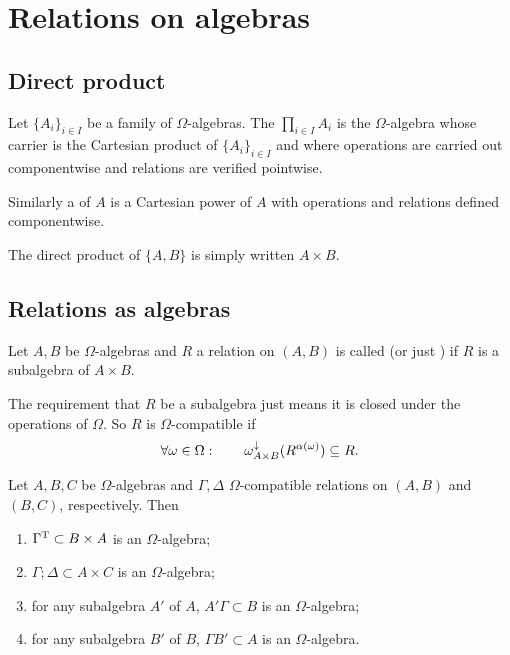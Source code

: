 \section{Relations on algebras}
\subsection{Direct product}
\begin{definition}
Let $\{A_i\}_{i\in I}$ be a family of $\Omega$-algebras. The  $\prod_{i\in I} A_i$ is the $\Omega$-algebra whose carrier is the Cartesian product of $\{A_i\}_{i\in I}$ and where operations are carried out componentwise and relations are verified pointwise.

Similarly a  of $A$ is a Cartesian power of $A$ with operations and relations defined componentwise.
\end{definition}

The direct product of $\{A,B\}$ is simply written $A\times B$.

\subsection{Relations as algebras}
\begin{definition}
Let $A,B$ be $\Omega$-algebras and $R$ a relation on $(A,B)$ is called  (or just ) if $R$ is a subalgebra of $A\times B$.
\end{definition}
The requirement that $R$ be a subalgebra just means it is closed under the operations of $\Omega$. So $R$ is $\Omega$-compatible if
\[ \forall \omega\in\Omega: \qquad \omega_{A\times B}^\downarrow(R^{\alpha(\omega)}) \subseteq R. \]

\begin{lemma}
Let $A,B,C$ be $\Omega$-algebras and $\Gamma, \Delta$ $\Omega$-compatible relations on $(A, B)$ and $(B, C)$, respectively. Then
\begin{enumerate}
\item $\Gamma^{\mathrm{T}} \subset B\times A$ is an $\Omega$-algebra;
\item $\Gamma;\Delta \subset A\times C$ is an $\Omega$-algebra;
\item for any subalgebra $A'$ of $A$, $A'\Gamma \subset B$ is an $\Omega$-algebra;
\item for any subalgebra $B'$ of $B$, $\Gamma B' \subset A$ is an $\Omega$-algebra.
\end{enumerate}
\end{lemma}

